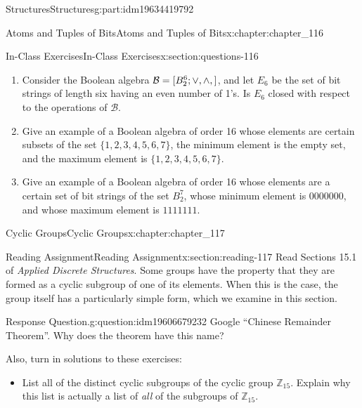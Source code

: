 \documentclass[oneside,10pt,]{book}
\numberwithin{equation}{section}
\begin{document}
\begin{partptx}{Structures}{}{Structures}{}{}{g:part:idm19634419792}
\begin{chapterptx}{Atoms and Tuples of Bits}{}{Atoms and Tuples of Bits}{}{}{x:chapter:chapter_116}
\begin{sectionptx}{In-Class Exercises}{}{In-Class Exercises}{}{}{x:section:questions-116}
\begin{enumerate}[label=\arabic*.]
\begin{enumerate}[label=(\alph*)]
\item{}Since the elements of a two-element Boolean algebra must be the greatest and least elements, 1 and 0, the tables for the operations on \(\{0, 1\}\) are determined by the Boolean algebra laws. Write out the operation tables for \([\{0, 1\}; \lor , \land, -]\).%
\end{enumerate}
%
\item{}Consider the Boolean algebra \(\mathcal{B} = [B_2^6 ; \lor, \land, \- ]\), and let \(E_6\) be the set of bit strings of length six having an even number of 1's.  Is \(E_6\) closed with respect to the operations of \(\mathcal{B}\).%
\item{}Give an example of a Boolean algebra of order 16 whose elements are certain subsets of the set \(\{1, 2, 3, 4, 5, 6, 7\}\), the minimum element is the empty set, and the maximum element is \(\{1, 2, 3, 4, 5, 6, 7\}\).%
\item{}Give an example of a Boolean algebra of order 16 whose elements are a certain set of bit strings of the set \(B_2^7\), whose minimum element is \(0000000\), and whose maximum element is \(1111111\).%
\end{enumerate}
%
\end{sectionptx}
\end{chapterptx}
%
\typeout{************************************************}
\typeout{************************************************}
%
\begin{chapterptx}{Cyclic Groups}{}{Cyclic Groups}{}{}{x:chapter:chapter_117}
\index{}%
%
%
\typeout{************************************************}
\typeout{************************************************}
%
\begin{sectionptx}{Reading Assignment}{}{Reading Assignment}{}{}{x:section:reading-117}
Read Sections 15.1 of \emph{Applied Discrete Structures}. Some groups have the property that they are formed as a cyclic subgroup of one of its elements.  When this is the case, the group itself has a particularly simple form, which we examine in this section.%
\begin{question}{Response Question.}{g:question:idm19606679232}%
Google ``Chinese Remainder Theorem''. Why does the theorem have this name?%
\end{question}
Also, turn in solutions to these exercises:%
\begin{itemize}[label=\textbullet]
\item{}List all of the distinct cyclic subgroups of the cyclic group \(\mathbb{Z}_{15}\).  Explain why this list is actually a list of \emph{all} of the subgroups of \(\mathbb{Z}_{15}\).%

\end{itemize}
\end{sectionptx}
\end{chapterptx}
\end{partptx}
\end{document}
